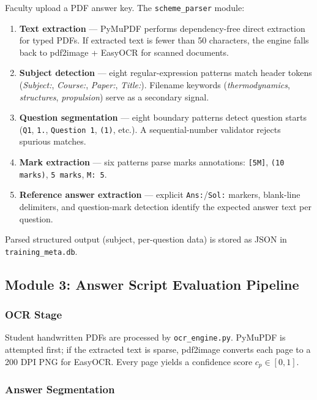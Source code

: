 \documentclass[conference]{IEEEtran}
\begin{document}
Faculty upload a PDF answer key. The \texttt{scheme\_parser} module:

\begin{enumerate}
    \item \textbf{Text extraction} — PyMuPDF performs dependency-free direct extraction for typed PDFs. If extracted text is fewer than 50 characters, the engine falls back to pdf2image + EasyOCR for scanned documents.
    \item \textbf{Subject detection} — eight regular-expression patterns match header tokens (\textit{Subject:}, \textit{Course:}, \textit{Paper:}, \textit{Title:}). Filename keywords (\textit{thermodynamics}, \textit{structures}, \textit{propulsion}) serve as a secondary signal.
    \item \textbf{Question segmentation} — eight boundary patterns detect question starts (\texttt{Q1}, \texttt{1.}, \texttt{Question 1}, \texttt{(1)}, etc.). A sequential-number validator rejects spurious matches.
    \item \textbf{Mark extraction} — six patterns parse marks annotations: \texttt{[5M]}, \texttt{(10 marks)}, \texttt{5 marks}, \texttt{M: 5}.
    \item \textbf{Reference answer extraction} — explicit \texttt{Ans:}/\texttt{Sol:} markers, blank-line delimiters, and question-mark detection identify the expected answer text per question.
\end{enumerate}

Parsed structured output (subject, per-question data) is stored as JSON in \texttt{training\_meta.db}.

\subsection{Module 3: Answer Script Evaluation Pipeline}
\label{ssec:pipeline}

\subsubsection{OCR Stage}

Student handwritten PDFs are processed by \texttt{ocr\_engine.py}. PyMuPDF is attempted first; if the extracted text is sparse, pdf2image converts each page to a 200 DPI PNG for EasyOCR. Every page yields a confidence score $c_p \in [0, 1]$.

\subsubsection{Answer Segmentation}
\end{document}
